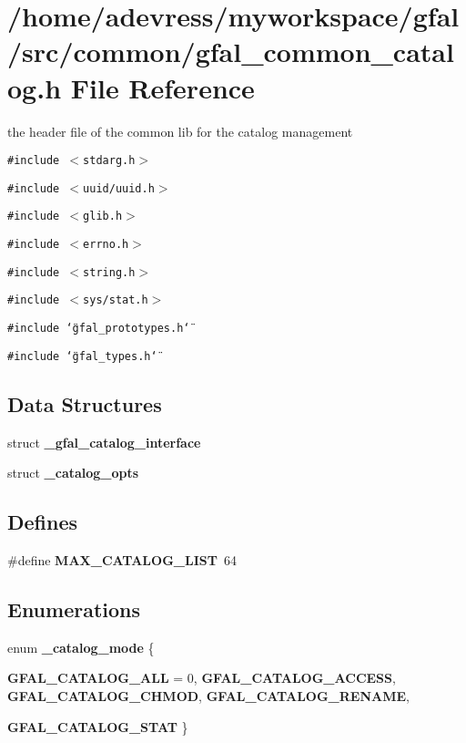 \section{/home/adevress/myworkspace/gfal/src/common/gfal\_\-common\_\-catalog.h File Reference}
\label{gfal__common__catalog_8h}
the header file of the common lib for the catalog management 

{\tt \#include $<$stdarg.h$>$}\par
{\tt \#include $<$uuid/uuid.h$>$}\par
{\tt \#include $<$glib.h$>$}\par
{\tt \#include $<$errno.h$>$}\par
{\tt \#include $<$string.h$>$}\par
{\tt \#include $<$sys/stat.h$>$}\par
{\tt \#include \char`\"{}gfal\_\-prototypes.h\char`\"{}}\par
{\tt \#include \char`\"{}gfal\_\-types.h\char`\"{}}\par
\subsection*{Data Structures}
\begin{CompactItemize}
\item 
struct \textbf{\_\-gfal\_\-catalog\_\-interface}
\item 
struct \bf{\_\-catalog\_\-opts}
\end{CompactItemize}
\subsection*{Defines}
\begin{CompactItemize}
\item 
\#define \textbf{MAX\_\-CATALOG\_\-LIST}~64\label{gfal__common__catalog_8h_c39f705683e893b91f559704ee2a707e}

\end{CompactItemize}
\subsection*{Enumerations}
\begin{CompactItemize}
\item 
enum \textbf{\_\-catalog\_\-mode} \{ \par
\textbf{GFAL\_\-CATALOG\_\-ALL} = 0, 
\textbf{GFAL\_\-CATALOG\_\-ACCESS}, 
\textbf{GFAL\_\-CATALOG\_\-CHMOD}, 
\textbf{GFAL\_\-CATALOG\_\-RENAME}, 
\par
\textbf{GFAL\_\-CATALOG\_\-STAT}
 \}
\end{CompactItemize}
